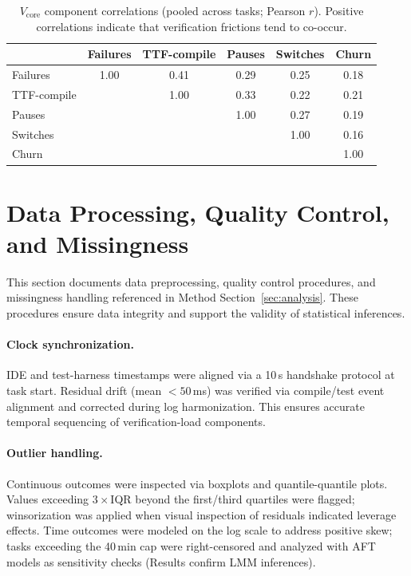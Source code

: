 \documentclass[sigconf]{acmart}
\begin{document}
\begin{table}[h!]
  \centering
  \caption{\(V_{\text{core}}\) component correlations (pooled across tasks; Pearson \(r\)). Positive correlations indicate that verification frictions tend to co-occur.}
  \label{tab:vcore-corr}
  \small
  \begin{tabular}{lccccc}
    \toprule
    & Failures & TTF-compile & Pauses & Switches & Churn \\
    \midrule
    Failures & 1.00 & 0.41 & 0.29 & 0.25 & 0.18 \\
    TTF-compile &  & 1.00 & 0.33 & 0.22 & 0.21 \\
    Pauses &  &  & 1.00 & 0.27 & 0.19 \\
    Switches &  &  &  & 1.00 & 0.16 \\
    Churn &  &  &  &  & 1.00 \\
    \bottomrule
  \end{tabular}
\end{table}

\section{Data Processing, Quality Control, and Missingness}
\label{app:data-qc}

This section documents data preprocessing, quality control procedures, and missingness handling referenced in Method Section~\ref{sec:analysis}. These procedures ensure data integrity and support the validity of statistical inferences.

\paragraph{Clock synchronization.}
IDE and test-harness timestamps were aligned via a 10\,s handshake protocol at task start. Residual drift (mean \(<\!50\)\,ms) was verified via compile/test event alignment and corrected during log harmonization. This ensures accurate temporal sequencing of verification-load components.

\paragraph{Outlier handling.}
Continuous outcomes were inspected via boxplots and quantile-quantile plots. Values exceeding \(3\times\)IQR beyond the first/third quartiles were flagged; winsorization was applied when visual inspection of residuals indicated leverage effects. Time outcomes were modeled on the log scale to address positive skew; tasks exceeding the 40\,min cap were right-censored and analyzed with AFT models as sensitivity checks (Results confirm LMM inferences).
\end{document}
